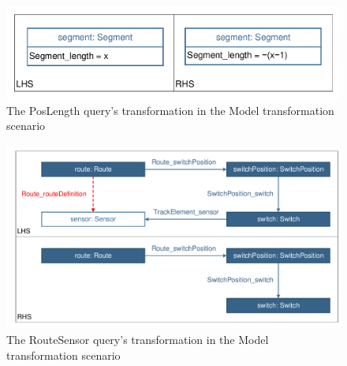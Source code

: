 \begin{figure}[h]
	\centering
	\includegraphics[scale=0.4]{figures/trainbenchmark-transformation-xform-poslength}
	\caption{The PosLength query's transformation in the Model transformation scenario}
	\label{fig:trainbenchmark-transformation-xform-poslength}
\end{figure}

\begin{figure}[h]
	\centering
	\includegraphics[scale=0.4]{figures/trainbenchmark-transformation-xform-routesensor}
	\caption{The RouteSensor query's transformation in the Model transformation scenario}
	\label{fig:trainbenchmark-transformation-xform-routesensor}
\end{figure}

